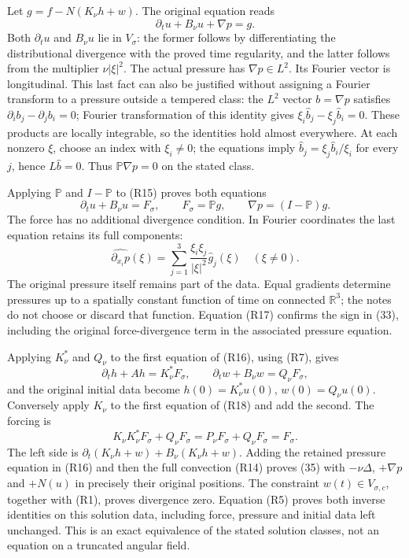 Let \(g=f-N(K_\nu h+w)\). The original equation reads \[
\partial_tu+B_\nu u+\nabla p=g.
\tag{R15}
\] Both \(\partial_tu\) and \(B_\nu u\) lie in \(V_\sigma\): the former follows by differentiating the distributional divergence with the proved time regularity, and the latter follows from the multiplier \(\nu|\xi|^2\). The actual pressure has \(\nabla p\in L^2\). Its Fourier vector is longitudinal. This last fact can also be justified without assigning a Fourier transform to a pressure outside a tempered class: the \(L^2\) vector \(b=\nabla p\) satisfies \(\partial_i b_j-\partial_j b_i=0\); Fourier transformation of this identity gives \(\xi_i\widehat b_j-\xi_j\widehat b_i=0\). These products are locally integrable, so the identities hold almost everywhere. At each nonzero \(\xi\), choose an index with \(\xi_i\ne0\); the equations imply \(\widehat b_j=\xi_j\widehat b_i/\xi_i\) for every \(j\), hence \(L\widehat b=0\). Thus \(\mathbb P\nabla p=0\) on the stated class.

Applying \(\mathbb P\) and \(I-\mathbb P\) to (R15) proves both equations \[
\partial_tu+B_\nu u=F_\sigma,\qquad
F_\sigma=\mathbb P g,
\qquad \nabla p=(I-\mathbb P)g.
\tag{R16}
\] The force has no additional divergence condition. In Fourier coordinates the last equation retains its full components: \[
\widehat{\partial_{x_i}p}(\xi)
=\sum_{j=1}^3\frac{\xi_i\xi_j}{|\xi|^2}\widehat g_j(\xi)
\quad(\xi\ne0).
\tag{R17}
\] The original pressure itself remains part of the data. Equal gradients determine pressures up to a spatially constant function of time on connected \(\mathbb R^3\); the notes do not choose or discard that function. Equation (R17) confirms the sign in (33), including the original force-divergence term in the associated pressure equation.

Applying \(K_\nu^*\) and \(Q_\nu\) to the first equation of (R16), using (R7), gives \[
\partial_t h+Ah=K_\nu^*F_\sigma,
\qquad
\partial_t w+B_\nu w=Q_\nu F_\sigma,
\tag{R18}
\] and the original initial data become \(h(0)=K_\nu^*u(0)\), \(w(0)=Q_\nu u(0)\). Conversely apply \(K_\nu\) to the first equation of (R18) and add the second. The forcing is \[
K_\nu K_\nu^*F_\sigma+Q_\nu F_\sigma
=P_\nu F_\sigma+Q_\nu F_\sigma=F_\sigma.
\] The left side is \(\partial_t(K_\nu h+w)+B_\nu(K_\nu h+w)\). Adding the retained pressure equation in (R16) and then the full convection (R14) proves (35) with \(-\nu\Delta\), \(+\nabla p\) and \(+N(u)\) in precisely their original positions. The constraint \(w(t)\in V_{\sigma,c}\), together with (R1), proves divergence zero. Equation (R5) proves both inverse identities on this solution data, including force, pressure and initial data left unchanged. This is an exact equivalence of the stated solution classes, not an equation on a truncated angular field.

